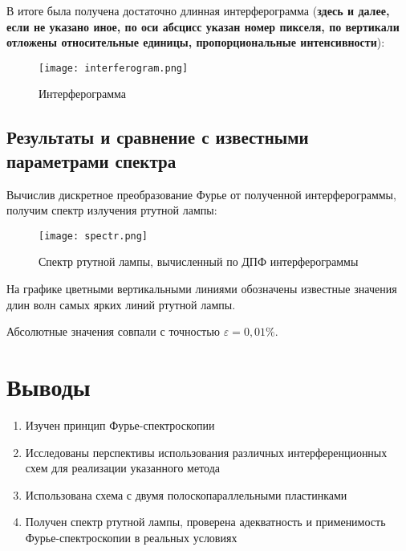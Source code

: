 \documentclass{urticle}
\begin{document}
  
	
	
	В итоге была получена достаточно длинная интерферограмма (\textbf{здесь и далее, если не указано иное, по оси абсцисс указан номер пикселя, по вертикали отложены относительные единицы, пропорциональные интенсивности}):
	\begin{figure}[H]
	\centering
  	\texttt{[image: interferogram.png]}
  \caption{Интерферограмма}
\end{figure}

\newpage
	\subsection*{Результаты и сравнение с известными параметрами спектра}
	
	Вычислив дискретное преобразование Фурье от полученной интерферограммы, получим спектр излучения ртутной лампы:
	
	\begin{figure}[H]
	\centering
  	\texttt{[image: spectr.png]}
  \caption{Спектр ртутной лампы, вычисленный по ДПФ интерферограммы}
  \end{figure}
  На графике цветными вертикальными линиями обозначены известные значения длин волн самых ярких линий ртутной лампы.
  
  Абсолютные значения совпали с точностью $\varepsilon = 0,01\%$.

	
\section*{Выводы}
\begin{enumerate}
	\item Изучен принцип Фурье-спектроскопии
	\item Исследованы перспективы использования различных интерференционных схем для реализации указанного метода
	\item Использована схема с двумя полоскопараллельными пластинками
	\item Получен спектр ртутной лампы, проверена адекватность и применимость Фурье-спектроскопии в реальных условиях
\end{enumerate}
\end{document}
